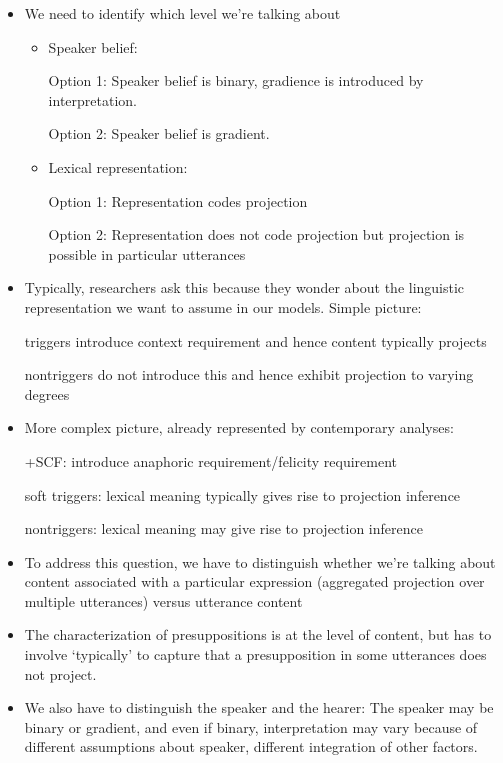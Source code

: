 \documentclass[11pt,fleqn]{article}
\newcommand{\6}{\mbox{$[\hspace*{-.6mm}[$}}
\newcommand{\9}{\mbox{$]\hspace*{-.6mm}]$}}
\begin{document}
\begin{itemize}

\item We need to identify which level we're talking about

\begin{itemize}

\item Speaker belief:

Option 1: Speaker belief is binary, gradience is introduced by interpretation.

Option 2: Speaker belief is gradient.

\item Lexical representation:

Option 1: Representation codes projection

Option 2: Representation does not code projection but projection is possible in particular utterances

\end{itemize}

\item Typically, researchers ask this because they wonder about the linguistic representation we want to assume in our models. Simple picture:

triggers introduce context requirement and hence content typically projects

nontriggers do not introduce this and hence exhibit projection to varying degrees

\item More complex picture, already represented by contemporary analyses:

+SCF: introduce anaphoric requirement/felicity requirement

soft triggers: lexical meaning typically gives rise to projection inference

nontriggers: lexical meaning may give rise to projection inference

\item To address this question, we have to distinguish whether we're talking about content associated with a particular expression (aggregated projection over multiple utterances) versus utterance content

\item The characterization of presuppositions is at the level of content, but has to involve `typically' to capture that a presupposition in some utterances does not project.

\item We also have to distinguish the speaker and the hearer: The speaker may be binary or gradient, and even if binary, interpretation may vary because of different assumptions about speaker, different integration of other factors.


\end{itemize}
\end{document}
